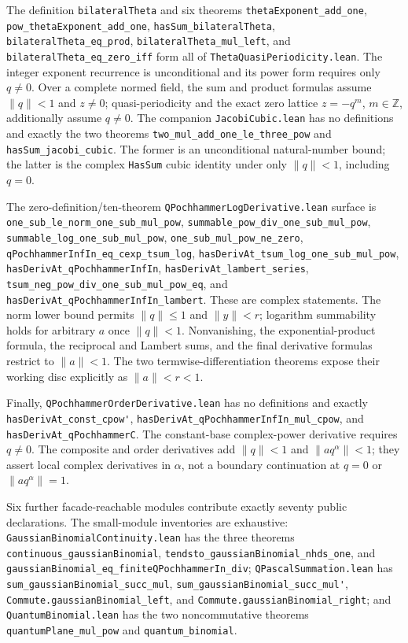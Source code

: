 \documentclass[11pt,oneside]{article}
\theoremstyle{definition}
\theoremstyle{remark}
\begin{document}
The definition \nolinkurl{bilateralTheta} and six theorems
\nolinkurl{thetaExponent_add_one},
\nolinkurl{pow_thetaExponent_add_one},
\nolinkurl{hasSum_bilateralTheta}, \nolinkurl{bilateralTheta_eq_prod},
\nolinkurl{bilateralTheta_mul_left}, and
\nolinkurl{bilateralTheta_eq_zero_iff} form all of
\nolinkurl{ThetaQuasiPeriodicity.lean}.  The integer exponent recurrence is
unconditional and its power form requires only \(q\ne0\).  Over a complete
normed field, the sum and product formulas assume \(\lVert q\rVert<1\) and
\(z\ne0\); quasi-periodicity and the exact zero lattice
\(z=-q^m\), \(m\in\mathbb Z\), additionally assume \(q\ne0\).
The companion \nolinkurl{JacobiCubic.lean} has no definitions and exactly the
two theorems \nolinkurl{two_mul_add_one_le_three_pow} and
\nolinkurl{hasSum_jacobi_cubic}.  The former is an unconditional natural-number
bound; the latter is the complex \texttt{HasSum} cubic identity under only
\(\lVert q\rVert<1\), including \(q=0\).

The zero-definition/ten-theorem
\nolinkurl{QPochhammerLogDerivative.lean} surface is
\nolinkurl{one_sub_le_norm_one_sub_mul_pow},
\nolinkurl{summable_pow_div_one_sub_mul_pow},
\nolinkurl{summable_log_one_sub_mul_pow},
\nolinkurl{one_sub_mul_pow_ne_zero},
\nolinkurl{qPochhammerInfIn_eq_cexp_tsum_log},
\nolinkurl{hasDerivAt_tsum_log_one_sub_mul_pow},
\nolinkurl{hasDerivAt_qPochhammerInfIn},
\nolinkurl{hasDerivAt_lambert_series},
\nolinkurl{tsum_neg_pow_div_one_sub_mul_pow_eq}, and
\nolinkurl{hasDerivAt_qPochhammerInfIn_lambert}.  These are complex
statements.  The norm lower bound permits \(\lVert q\rVert\le1\) and
\(\lVert y\rVert<r\); logarithm summability holds for arbitrary \(a\) once
\(\lVert q\rVert<1\).  Nonvanishing, the exponential-product formula, the
reciprocal and Lambert sums, and the final derivative formulas restrict to
\(\lVert a\rVert<1\).  The two termwise-differentiation theorems expose their
working disc explicitly as \(\lVert a\rVert<r<1\).

Finally, \nolinkurl{QPochhammerOrderDerivative.lean} has no definitions and
exactly \nolinkurl{hasDerivAt_const_cpow'},
\nolinkurl{hasDerivAt_qPochhammerInfIn_mul_cpow}, and
\nolinkurl{hasDerivAt_qPochhammerC}.  The constant-base complex-power
derivative requires \(q\ne0\).  The composite and order derivatives add
\(\lVert q\rVert<1\) and \(\lVert a q^\alpha\rVert<1\); they assert local
complex derivatives in \(\alpha\), not a boundary continuation at
\(q=0\) or \(\lVert a q^\alpha\rVert=1\).

Six further facade-reachable modules contribute exactly seventy public
declarations.  The small-module inventories are exhaustive:
\nolinkurl{GaussianBinomialContinuity.lean} has the three theorems
\nolinkurl{continuous_gaussianBinomial},
\nolinkurl{tendsto_gaussianBinomial_nhds_one}, and
\nolinkurl{gaussianBinomial_eq_finiteQPochhammerIn_div};
\nolinkurl{QPascalSummation.lean} has
\nolinkurl{sum_gaussianBinomial_succ_mul},
\nolinkurl{sum_gaussianBinomial_succ_mul'},
\nolinkurl{Commute.gaussianBinomial_left}, and
\nolinkurl{Commute.gaussianBinomial_right}; and
\nolinkurl{QuantumBinomial.lean} has the two noncommutative theorems
\nolinkurl{quantumPlane_mul_pow} and \nolinkurl{quantum_binomial}.
\end{document}
